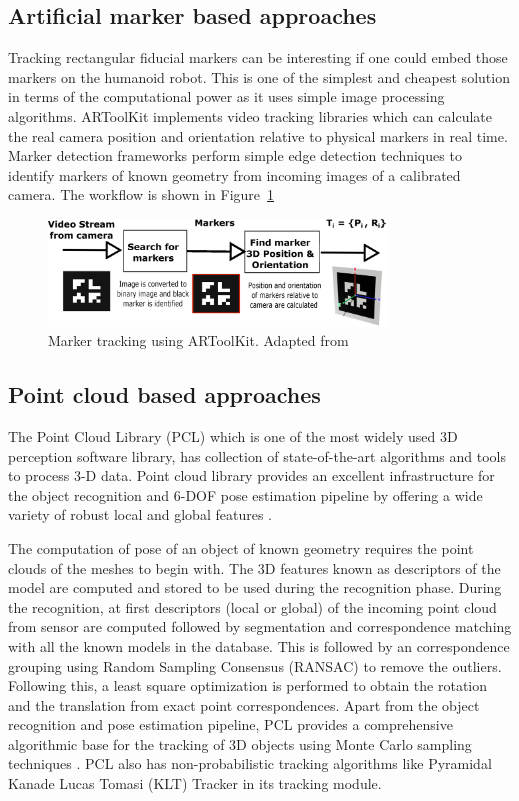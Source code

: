 \subsection{Artificial marker based approaches}
Tracking rectangular fiducial markers can be interesting if one could embed those markers on the humanoid robot. This is one of the simplest and cheapest solution in terms of the computational power as it uses simple image processing algorithms. ARToolKit \cite{kato1999marker} implements video tracking libraries which can calculate the real camera position and orientation relative to physical markers in real time. Marker detection frameworks perform simple edge detection techniques to identify markers of known geometry from incoming images of a calibrated camera. The workflow is shown in Figure~\ref{fig:artoolkit}
\begin{figure}[H]
\centering
\includegraphics[width=0.8\textwidth]{assets/artoolkit.eps}
\caption[Marker tracking using ARToolKit]{Marker tracking using ARToolKit. {Adapted from \cite{kato1999marker}}}
\label{fig:artoolkit}
\end{figure}
\subsection{Point cloud based approaches}
\label{ssec:pcl}
The Point Cloud Library (PCL) \cite{rusu20113d} which is one of the most widely used 3D perception software library, has collection of state-of-the-art algorithms and tools to process 3-D data. Point cloud library provides an excellent infrastructure for the object recognition and 6-DOF pose estimation pipeline by offering a wide variety of robust local and global features \cite{aldoma2012point}. 

The computation of pose of an object of known geometry requires the point clouds of the meshes to begin with. The 3D features known as descriptors of the model are computed and stored to be used during the recognition phase.  During the recognition, at first descriptors (local or global) of the incoming point cloud from sensor are computed followed by segmentation and correspondence matching with all the known models in the database. This is followed by an correspondence grouping using Random Sampling Consensus (RANSAC) to remove the outliers. Following this, a least square optimization is performed to obtain the rotation and the translation from exact point correspondences. Apart from the object recognition and pose estimation pipeline, PCL provides a comprehensive algorithmic base for the tracking of 3D objects using Monte Carlo sampling techniques \cite{RUeda2012}. PCL also has non-probabilistic tracking algorithms like Pyramidal Kanade Lucas Tomasi (KLT) Tracker in its tracking module.
